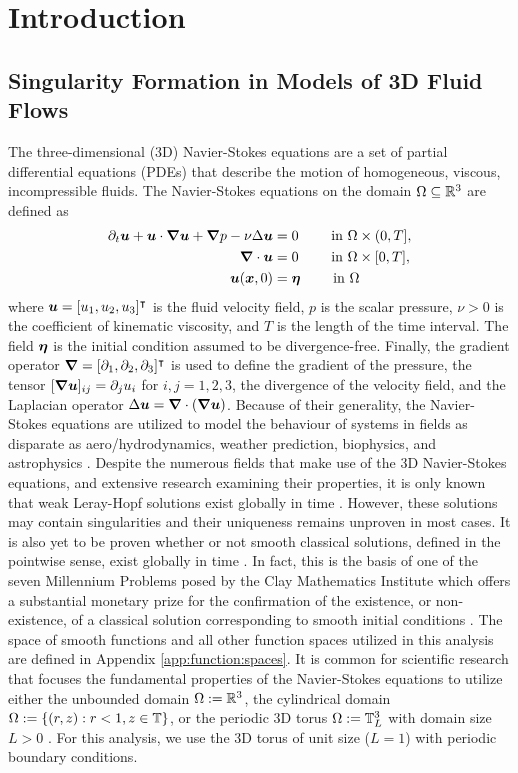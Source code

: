 \chapter{Introduction} 

\section{Singularity Formation in Models of 3D Fluid Flows}
The three-dimensional (3D) Navier-Stokes equations are a set of partial differential equations (PDEs) that describe the motion of homogeneous, viscous, incompressible fluids. The Navier-Stokes equations on the domain $\Omega\subseteq \mathbb{R}^3$ are defined as 
\begin{subequations}\label{eq:Navier:Stokes}
\begin{align}
\partial_t \boldsymbol u + \boldsymbol u\cdot {\boldsymbol \nabla} \boldsymbol u + {\boldsymbol \nabla} p - \nu \Delta \boldsymbol u &= 0 \qquad\text{ in } \Omega\times (0,T],\\
{\boldsymbol \nabla} \cdot \boldsymbol u &= 0 \qquad\text{ in } \Omega\times [0,T],\\
\boldsymbol u(\boldsymbol x,0) &= {\boldsymbol \eta} \qquad\text{ in }\Omega
\end{align}
\end{subequations}
\noindent where $\boldsymbol u = [u_1,u_2,u_3]^\intercal$ is the fluid velocity field, $p$ is the scalar pressure, $\nu>0$ is the coefficient of kinematic viscosity, and $T$ is the length of the time interval. The field ${\boldsymbol \eta}$ is the initial condition assumed to be divergence-free. Finally, the gradient operator ${\boldsymbol \nabla} = [\partial_1,\partial_2,\partial_3]^\intercal$ is used to define the gradient of the pressure, the tensor $[{\boldsymbol \nabla} \boldsymbol u]_{ij}=\partial_j u_i$ for $i,j=1,2,3$, the divergence of the velocity field, and the Laplacian operator $\Delta \boldsymbol u= {\boldsymbol \nabla} \cdot({\boldsymbol \nabla}\boldsymbol u)$. Because of their generality, the Navier-Stokes equations are utilized to model the behaviour of systems in fields as disparate as aero/hydrodynamics, weather prediction, biophysics, and astrophysics \cite{cho_solving_2022,doering_3d_2009}. Despite the numerous fields that make use of the 3D Navier-Stokes equations, and extensive research examining their properties, it is only known that weak Leray-Hopf solutions exist globally in time \cite{leray_sur_1934}. However, these solutions may contain singularities and their uniqueness remains unproven in most cases. It is also yet to be proven whether or not smooth classical solutions, defined in the pointwise sense, exist globally in time \cite{protas_systematic_2022}. In fact, this is the basis of one of the seven Millennium Problems posed by the Clay Mathematics Institute which offers a substantial monetary prize for the confirmation of the existence, or non-existence, of a classical solution corresponding to smooth initial conditions \cite{fefferman_existence_2022}. The space of smooth functions and all other function spaces utilized in this analysis are defined in Appendix \ref{app:function:spaces}. It is common for scientific research that focuses the fundamental properties of the Navier-Stokes equations to utilize either the unbounded domain $\Omega := \mathbb{R}^3$, the cylindrical domain $\Omega := \left\lbrace (r,z):r<1,z\in \mathbb{T} \right\rbrace$, or the periodic 3D torus $\Omega := \mathbb{T}^3_L$ with domain size $L>0$ \cite{protas_systematic_2022}. For this analysis, we use the 3D torus of unit size ($L=1$) with periodic boundary conditions.

